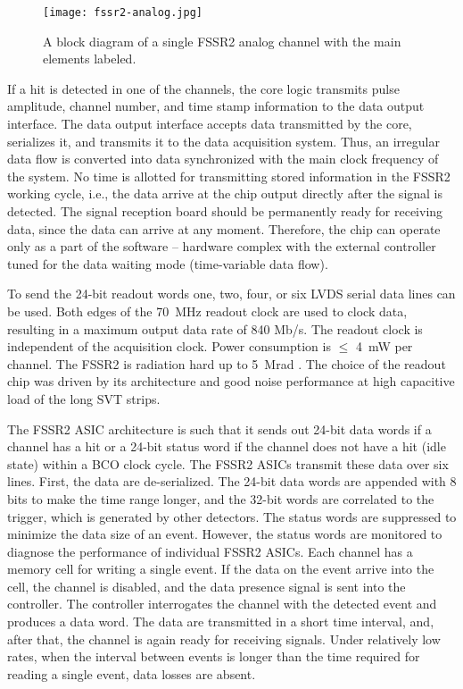 \begin{figure}[hbt] 
\centering 
\texttt{[image: fssr2-analog.jpg]}
\caption{A block diagram of a single FSSR2 analog channel with the main elements labeled.}
\label{fig:fssr2-analog}
\end{figure}

If a hit is detected in one of the channels, the core logic transmits pulse amplitude, channel number, and time stamp information to the data output interface. The data output interface accepts data transmitted by the core, serializes it, and transmits it to the data acquisition system. Thus, an irregular data flow is converted into data synchronized with the main clock frequency of the system. No time is allotted for transmitting stored information in the FSSR2 working cycle, i.e., the data arrive at the chip output directly after the signal is detected. The signal reception board should be permanently ready for receiving data, since the data can arrive at any moment. Therefore, the chip can operate only as a part of the software -- hardware complex with the external controller tuned for the data waiting mode (time-variable data flow). 

To send the 24-bit readout words one, two, four, or six LVDS serial data lines can be used. Both edges of the 70~MHz readout clock are used to clock data, resulting in a maximum output data rate of 840 Mb/s. The readout clock is independent of the acquisition clock. Power consumption is $\le$ 4~mW per channel. The FSSR2 is radiation hard up to 5~Mrad \cite{DINARDOTHESIS}. The choice of the readout chip was driven by its architecture and good noise performance at high capacitive load of the long SVT strips.

The FSSR2 ASIC architecture is such that it sends out 24-bit data words if a channel has a hit or a 24-bit status word if the channel does not have a hit (idle state) within a BCO clock cycle. The FSSR2 ASICs transmit these data over six lines. First, the data are de-serialized. The 24-bit data words are appended with 8 bits to make the time range longer, and the 32-bit words are correlated to the trigger, which is generated by other detectors. The status words are suppressed to minimize the data size of an event. However, the status words are monitored to diagnose the performance of individual FSSR2 ASICs. Each channel has a memory cell for writing a single event. If the data on the event arrive into the cell, the channel is disabled, and the data presence signal is sent into the controller. The controller interrogates the channel with the detected event and produces a data word. The data are transmitted in a short time interval, and, after that, the channel is again ready for receiving signals. Under relatively low rates, when the interval between events is longer than the time required for reading a single event, data losses are absent. 

